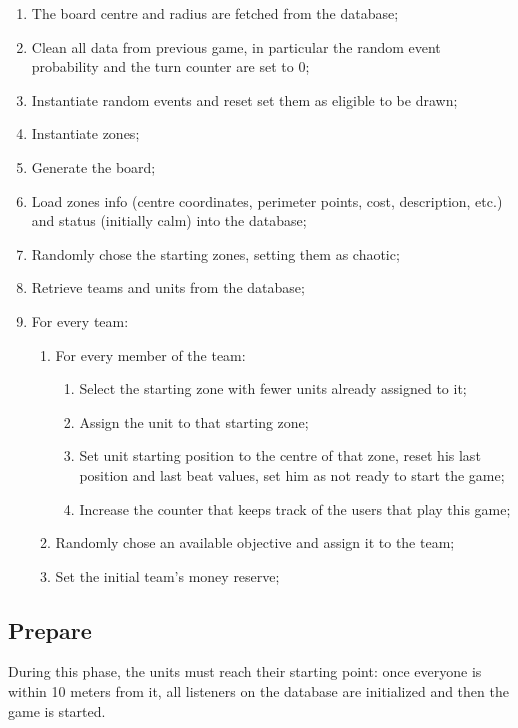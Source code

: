 			\begin{enumerate}
				\item The board centre and radius are fetched from the database;
				\item Clean all data from previous game, in particular the random event probability and the turn counter are set to 0;
				\item Instantiate random events and reset set them as eligible to be drawn;
				\item Instantiate zones;
				\item Generate the board;
				\item Load zones info (centre coordinates, perimeter points, cost, description, etc.) and status (initially calm) into the database;
				\item Randomly chose the starting zones, setting them as chaotic;
				\item Retrieve teams and units from the database;
				\item For every team: 
				\begin{enumerate}					
					\item For every member of the team:
					\begin{enumerate}
						\item Select the starting zone with fewer units already assigned to it;
						\item Assign the unit to that starting zone;
						\item Set unit starting position to the centre of that zone, reset his last position and last beat values, set him as not ready to start the game;
						\item Increase the counter that keeps track of the users that play this game;
					\end{enumerate}
					\item Randomly chose an available objective and assign it to the team;
					\item Set the initial team's money reserve;
				\end{enumerate}
			\end{enumerate}
		
		\subsection{Prepare}
		
			During this phase, the units must reach their starting point: once everyone is within 10 meters from it, all listeners on the database are initialized and then the game is started.
		
